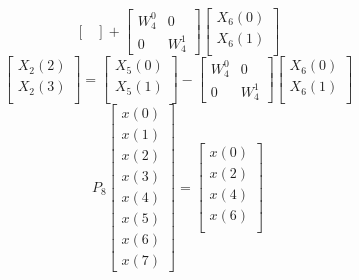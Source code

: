 \documentclass[journal,12pt,twocolumn]{IEEEtran}
\renewcommand\thesection{\arabic{section}}
\begin{document}
\begin{enumerate}[label=\thesection.\arabic*]
\begin{enumerate}[label=\arabic*.,ref=\thesection.\theenumi]
\begin{equation}
\begin{bmatrix}
       \end{bmatrix}
       +
       \begin{bmatrix}
         W^{0}_{4} & 0\\
         0 & W^{1}_{4}
       \end{bmatrix}
       \begin{bmatrix}
         X_{6}(0) \\ 
         X_{6}(1) \\ 
       \end{bmatrix}
     \end{equation}
     \begin{equation}
       \begin{bmatrix}
         X_{2}(2) \\ 
         X_{2}(3)\\ 
       \end{bmatrix}
       =
       \begin{bmatrix}
         X_{5}(0) \\ 
         X_{5}(1)\\ 
       \end{bmatrix}
       -
       \begin{bmatrix}
         W^{0}_{4} & 0\\
         0 & W^{1}_{4}
       \end{bmatrix}
       \begin{bmatrix}
         X_{6}(0) \\ 
         X_{6}(1) \\ 
       \end{bmatrix}
     \end{equation}
     \begin{equation}
       P_{8}
       \begin{bmatrix}
         x(0) \\ 
         x(1) \\ 
         x(2) \\ 
         x(3) \\ 
         x(4) \\ 
         x(5) \\
         x(6) \\
         x(7)
       \end{bmatrix}
       = 
       \begin{bmatrix}
         x(0) \\ 
         x(2) \\ 
         x(4) \\ 
         x(6) \\

\end{bmatrix}
\end{equation}
\end{enumerate}
\end{enumerate}
\end{document}
